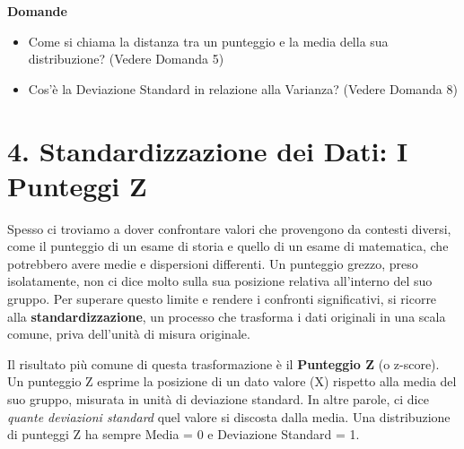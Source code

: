 \documentclass[12pt, a4paper]{article}
\newenvironment{reflectionbox}{%
    \medskip %
    \begin{framed}\par\noindent
    \textbf{\color{boxtitlecolor}Domande} \par
    \begin{itemize}[leftmargin=*, label=$\blacktriangleright$]
}{%
    \end{itemize}\par
    \end{framed}
    \medskip %
}
\begin{document}
\begin{reflectionbox}
    \item Come si chiama la distanza tra un punteggio e la media della sua distribuzione? (Vedere Domanda 5)
    \item Cos'è la Deviazione Standard in relazione alla Varianza? (Vedere Domanda 8)
\end{reflectionbox}

\section*{4. Standardizzazione dei Dati: I Punteggi Z}
Spesso ci troviamo a dover confrontare valori che provengono da contesti diversi, come il punteggio di un esame di storia e quello di un esame di matematica, che potrebbero avere medie e dispersioni differenti. Un punteggio grezzo, preso isolatamente, non ci dice molto sulla sua posizione relativa all'interno del suo gruppo. Per superare questo limite e rendere i confronti significativi, si ricorre alla \textbf{standardizzazione}, un processo che trasforma i dati originali in una scala comune, priva dell'unità di misura originale.

Il risultato più comune di questa trasformazione è il \textbf{Punteggio Z} (o z-score). Un punteggio Z esprime la posizione di un dato valore (X) rispetto alla media del suo gruppo, misurata in unità di deviazione standard. In altre parole, ci dice \textit{quante deviazioni standard} quel valore si discosta dalla media. Una distribuzione di punteggi Z ha sempre Media = 0 e Deviazione Standard = 1.
\end{document}

